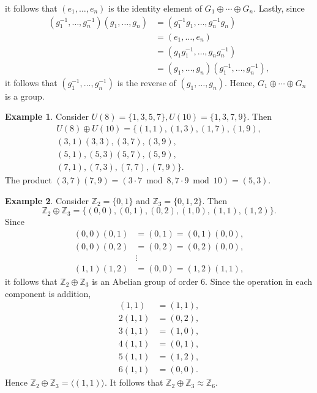 \documentclass{article}
\theoremstyle{definition}
\newtheorem{example}{Example}[section]
\begin{document}
     it follows that $(e_1,\dots,e_n)$ is the identity element of $G_1 \oplus \cdots \oplus G_n$. Lastly, since
     \begin{align*}
         (g_1^{-1},\dots,g_n^{-1})(g_1,\dots,g_n) &= (g_1^{-1}g_1,\dots,g_n^{-1}g_n) \\
         &= (e_1,\dots,e_n) \\
         &= (g_1g_1^{-1},\dots,g_ng_n^{-1}) \\
         &= (g_1,\dots,g_n)(g_1^{-1},\dots,g_n^{-1}),
     \end{align*}
     it follows that $(g_1^{-1},\dots,g_n^{-1})$ is the reverse of $(g_1,\dots,g_n)$. Hence, $G_1 \oplus \cdots \oplus G_n$ is a group. 
     
     \begin{example}
     Consider $U(8) = \{1,3,5,7\}, U(10) = \{1,3,7,9\}$. Then
         \begin{align*}
             U(8) \oplus U(10) = \{(1,1),(1,3),(1,7),(1,9), \\ (3,1)(3,3), (3,7),(3,9), \\ (5,1),(5,3)(5,7),(5,9), \\ (7,1),(7,3),(7,7),(7,9)\}.
         \end{align*}
         The product $(3,7)(7,9) = (3\cdot7 \bmod 8, 7\cdot9 \bmod 10) = (5,3)$.
     \end{example}
     
     \begin{example}
     Consider $\mathbb{Z}_2 = \{0,1\}$ and $\mathbb{Z}_3=\{0,1,2\}$. Then
     \begin{equation*}
         \mathbb{Z}_2 \oplus \mathbb{Z}_3 = \{(0,0),(0,1),(0,2),(1,0),(1,1),(1,2)\}.
     \end{equation*}
     Since
     \begin{align*}
         (0,0)(0,1) &= (0,1) = (0,1)(0,0), \\
         (0,0)(0,2) &= (0,2) = (0,2)(0,0), \\
         & \vdots \\
         (1,1)(1,2) &= (0,0) = (1,2)(1,1),
     \end{align*}
     it follows that $\mathbb{Z}_2 \oplus \mathbb{Z}_3$ is an Abelian group of order 6. Since the operation in each component is addition,
     \begin{align*}
         (1,1) &= (1,1), \\
         2(1,1) &= (0,2), \\
         3(1,1) &= (1,0), \\
         4(1,1) &= (0,1), \\
         5(1,1) &= (1,2), \\
         6(1,1) &= (0,0).
     \end{align*}
     Hence $\mathbb{Z}_2 \oplus \mathbb{Z}_3 = \langle (1,1) \rangle$. It follows that $\mathbb{Z}_2 \oplus \mathbb{Z}_3 \approx \mathbb{Z}_6$.
     \end{example}
     
\end{document}
